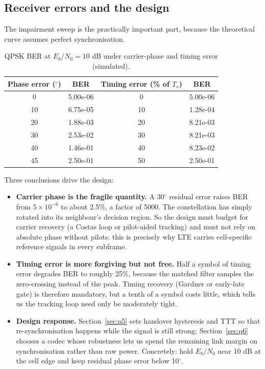 \documentclass[9pt,a4paper]{extarticle}
\begin{document}
\subsection{Receiver errors and the design}
The impairment sweep is the practically important part, because the theoretical curve assumes
perfect synchronisation.

\begin{table}[H]\centering\small
\caption{QPSK BER at $E_b/N_0=10$ dB under carrier-phase and timing error (simulated).}
\label{tab:impair}
\begin{tabular}{@{}cccc@{}}
\toprule
Phase error ($^\circ$) & BER & Timing error (\% of $T_s$) & BER \\
\midrule
0 & 5.00e-06 & 0 & 5.00e-06 \\
10 & 6.75e-05 & 10 & 1.28e-04 \\
20 & 1.88e-03 & 20 & 8.21e-03 \\
30 & 2.53e-02 & 30 & 8.21e-03 \\
40 & 1.46e-01 & 40 & 8.23e-02 \\
45 & 2.50e-01 & 50 & 2.50e-01 \\
\bottomrule
\end{tabular}
\end{table}

Three conclusions drive the design:

\begin{itemize}[leftmargin=1.4em,itemsep=1pt,topsep=2pt]
\item \textbf{Carrier phase is the fragile quantity.} A 30$^\circ$ residual error raises BER from
$5\times10^{-6}$ to about 2.5\%, a factor of 5000. The constellation has simply rotated into
its neighbour's decision region. So the design must budget for carrier recovery (a Costas loop or
pilot-aided tracking) and must not rely on absolute phase without pilots: this is precisely why
LTE carries cell-specific reference signals in every subframe.
\item \textbf{Timing error is more forgiving but not free.} Half a symbol of timing error
degrades BER to roughly 25\%, because the matched filter samples the zero-crossing instead of the
peak. Timing recovery (Gardner or early-late gate) is therefore mandatory, but a tenth of a
symbol costs little, which tells us the tracking loop need only be moderately tight.
\item \textbf{Design response.} Section~\ref{sec:q5} sets handover hysteresis and TTT so that
re-synchronisation happens while the signal is still strong; Section~\ref{sec:q6} chooses a codec
whose robustness lets us spend the remaining link margin on synchronisation rather than raw power.
Concretely: hold $E_b/N_0$ near 10 dB at the cell edge and keep residual phase error below
10$^\circ$.
\end{itemize}
\end{document}
